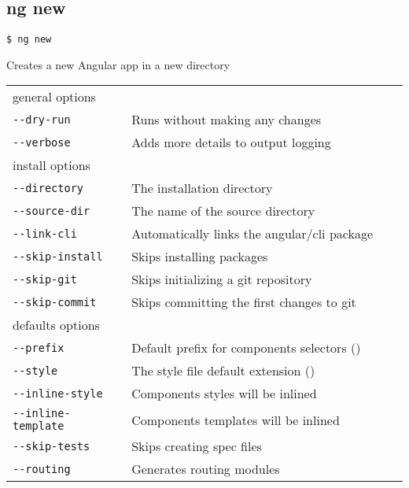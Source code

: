 \documentclass[8pt]{extarticle} %
\begin{document}
\begin{multicols}{3}
\section*{ng new}

  \vspace{1ex}
  {\tt \$ ng new \itt{[options...]} }

  \vspace{0.6ex}

  {\small Creates a new Angular app in a new directory}

  \vspace{0.6ex}

  \begin{tabular}{L{0.30\linewidth} L{0.70\linewidth}}
    \small{general options} & \\
    \tt -{}-dry-run & \small Runs without making any changes \\
    \tt -{}-verbose  & \small Adds more details to output logging \\
    \small{install options} & \\
    \tt -{}-directory  & \small The installation directory \\
    \tt -{}-source-dir  & \small The name of the source directory \\
    \tt -{}-link-cli & \small Automatically links the angular/cli package \\
    \tt -{}-skip-install & \small Skips installing packages \\
    \tt -{}-skip-git & \small Skips initializing a git repository \\
    \tt -{}-skip-commit & \small Skips committing the first changes to git \\
    \small{defaults options} & \\
    \tt -{}-prefix  & \small Default prefix for components selectors () \\
    \tt -{}-style  & \small The style file default extension () \\
    \tt -{}-inline-style & \small Components styles will be inlined \\
    \tt -{}-inline-template & \small Components templates will be inlined \\
    \tt -{}-skip-tests & \small Skips creating spec files \\
    \tt -{}-routing & \small Generates routing modules \\
  \end{tabular}


\end{multicols}
\end{document}

